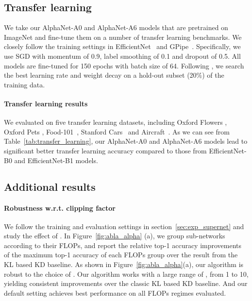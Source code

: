 \documentclass{article}
\begin{document}
\subsection{Transfer learning}
\label{sec:exp_transfer}

We take our AlphaNet-A0 and AlphaNet-A6 models that are pretrained on ImageNet and fine-tune them on a number of transfer learning benchmarks.
We closely follow the training settings in EfficientNet~\citep{tan2019efficientnet} and GPipe~\citep{huang2018gpipe}. 
Specifically, we use SGD with momentum of 0.9, label smoothing of 0.1 and dropout of 0.5. 
All models are fine-tuned for 150 epochs with batch size of 64. 
Following \citet{huang2018gpipe}, we search the best learning rate and weight decay on a hold-out subset (20\%) of the training data. 

    
\paragraph{Transfer learning results} 
We evaluated on five transfer learning datasets, including Oxford Flowers \citep{nilsback2008automated}, Oxford Pets \citep{parkhi2012cats}, Food-101~\citep{bossard2014food}, Stanford Cars~\citep{krause2013collecting} and Aircraft~\citep{maji2013fine}.
As we can see from Table~\ref{tab:transfer_learning}, 
our AlphaNet-A0 and  AlphaNet-A6 models lead to significant better transfer learning accuracy compared to those from EfficientNet-B0 and EfficientNet-B1 models. 


\subsection{Additional results}
\label{sec:exp_ablation}


\paragraph{Robustness w.r.t. clipping factor }
We follow the training and evaluation settings in section~\ref{sec:exp_supernet} and study the effect of .
In Figure~\ref{fig:abla_alpha} (a), we group sub-networks according to their FLOPs, and report the relative top-1 accuracy improvements of the maximum top-1 accuracy of each FLOPs group over the result from the KL based KD baseline.   
As shown in Figure~\ref{fig:abla_alpha}(a),  our algorithm is robust to the choice of . Our algorithm works with a large range of , from 1 to 10, yielding consistent improvements over the classic KL based KD baseline. 
And our default setting  achieves best performance on all FLOPs regimes evaluated.
\end{document}
